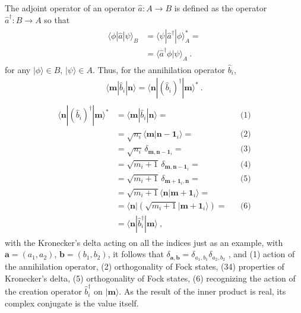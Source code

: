 \documentclass[letterpaper,10pt,english]{jupyterBook}
\begin{document}
\sphinxAtStartPar
The adjoint operator of an operator \(\hat{a}: A \rightarrow B\) is defined as the operator \(\hat{a}^\dagger: B \rightarrow A\) so that
\begin{equation*}
\begin{split}\begin{aligned}
  \langle \phi | \hat{a} | \psi \rangle_B 
  & = \langle \psi | \hat{a}^\dagger | \phi \rangle_A^* = \\
  & = \langle \hat{a}^\dagger \phi | \psi \rangle_A \ .
\end{aligned}\end{split}
\end{equation*}
\sphinxAtStartPar
for any \(| \phi \rangle \in B\), \(| \psi \rangle \in  A\). Thus, for the annihilation operator \(\hat{b}_i\),
\begin{equation*}
\begin{split}\langle \mathbf{m} | \hat{b}_i | \mathbf{n} \rangle = \langle \mathbf{n} | \left( \hat{b}_i \right)^{\dagger} | \mathbf{m} \rangle^* \ .\end{split}
\end{equation*}\begin{equation*}
\begin{split}\begin{aligned}
  \langle \mathbf{n} | \left( \hat{b}_i \right)^{\dagger} | \mathbf{m} \rangle^*
  & = \langle \mathbf{m} | \hat{b}_i  | \mathbf{n} \rangle = && {\text{(1)}} \\
  & = \sqrt{n_i} \langle \mathbf{m} | \mathbf{n} - \mathbf{1}_i \rangle = && {\text{(2)}} \\
  & = \sqrt{n_i} \, \delta_{\mathbf{m}, \mathbf{n}-\mathbf{1}_i} = && {\text{(3)}} \\
  & = \sqrt{m_i + 1} \, \delta_{\mathbf{m}, \mathbf{n}-\mathbf{1}_i} = && {\text{(4)}} \\
  & = \sqrt{m_i + 1} \, \delta_{\mathbf{m}+\mathbf{1}_i, \mathbf{n}} = && {\text{(5)}} \\
  & = \sqrt{m_i + 1} \langle \mathbf{n} | \mathbf{m} + \mathbf{1}_i \rangle = \\
  & = \langle \mathbf{n} | \left( \sqrt{m_i + 1}  | \mathbf{m} + \mathbf{1}_i \rangle \right) = && {\text{(6)}} \\
  & = \langle \mathbf{n} | \hat{b}_i^\dagger | \mathbf{m} \rangle \ ,
\end{aligned}\end{split}
\end{equation*}
\sphinxAtStartPar
with the Kronecker’s delta acting on all the indices \sphinxhyphen{} just as an example, with \(\mathbf{a} = (a_1, a_2)\), \(\mathbf{b} = (b_1, b_2)\), it follows that \(\delta_{\mathbf{a}, \mathbf{b}} = \delta_{a_1, b_1} \delta_{a_2, b_2}\) \sphinxhyphen{}, and (1) action of the annihilation operator, (2) orthogonality of Fock states, (3\sphinxhyphen{}4) properties of Kronecker’s delta, (5) orthogonality of Fock states, (6) recognizing the action of the creation operator \(\hat{b}_i^\dagger\) on \(| \mathbf{m} \rangle\). As the result of the inner product is real, its complex conjugate is the value itself.
\end{document}
